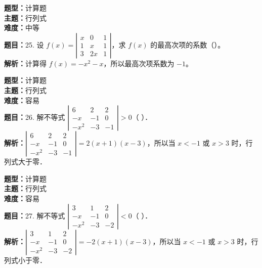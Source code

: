 \documentclass{ctexart}
\newenvironment{question}[5]{%
	\noindent\textbf{题型：}#1\\
	\textbf{主题：}#2\\
	\textbf{难度：}#3\\
	\textbf{题目：}#4\\
	\textbf{解析：}#5\\
	\vspace{1em}
}{}
\begin{document}
\begin{question} 
	{计算题} 
	{行列式}
	{中等}
	{25. 设 $f(x)=\left|\begin{array}{ccc}x & 0 & 1 \\ 1 & x & 1 \\ 3 & 2x & 1\end{array}\right|$，求 $f(x)$ 的最高次项的系数（）。}
	{计算得 $f(x) = -x^2 - x$，所以最高次项系数为 $-1$。}
\end{question}

\begin{question} 
	{计算题} 
	{行列式}
	{容易}
	{26. 解不等式 $\left|\begin{array}{ccc}6 & 2 & 2 \\ -x & -1 & 0 \\ -x^2 & -3 & -1\end{array}\right|>0$（ ）．}
	{$\left|\begin{array}{ccc}6 & 2 & 2 \\ -x & -1 & 0 \\ -x^2 & -3 & -1\end{array}\right| = 2(x+1)(x-3)$，所以当 $x<-1$ 或 $x>3$ 时，行列式大于零．}
\end{question}

\begin{question} 
	{计算题} 
	{行列式}
	{容易}
	{27. 解不等式 $\left|\begin{array}{ccc}3 & 1 & 2 \\ -x & -1 & 0 \\ -x^2 & -3 & -2\end{array}\right|<0$（ ）．}
	{$\left|\begin{array}{ccc}3 & 1 & 2 \\ -x & -1 & 0 \\ -x^2 & -3 & -2\end{array}\right| = -2(x+1)(x-3)$，所以当 $x<-1$ 或 $x>3$ 时，行列式小于零．}
\end{question}




\newpage
\end{document}
